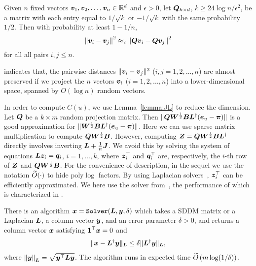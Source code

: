 \documentclass[10pt,twocolumn,twoside]{IEEEtran}
\begin{document}
\begin{lemma}
    \label{lemma:JL}
    Given $n$ fixed vectors \(\boldsymbol{v}_1,\boldsymbol{v}_2,\ldots,\boldsymbol{v}_n\in \mathbb{R}^d\) and
    \(\epsilon>0\), let
    \(\boldsymbol{Q}_{k\times d}\),  \(k\ge 24\log n/\epsilon^2\), be a matrix with each  entry equal  to \(1/\sqrt{k}\) or \(- 1/\sqrt{k}\)  with the same probability \(1/2\). Then with probability at least \(1-1/n\),
    \begin{equation*}
        \left\Vert\boldsymbol{v}_i-\boldsymbol{v}_j\right\Vert^2\approx_\epsilon\left\Vert\boldsymbol{Q}\boldsymbol{v}_i-\boldsymbol{Q}\boldsymbol{v}_j\right\Vert^2
    \end{equation*}
    for all all pairs  \(i,j\le n\).
\end{lemma}

 indicates that,  the pairwise distances \(\|\boldsymbol{v}_i-\boldsymbol{v}_j\|^2\) (\(i,j=1,2,\ldots, n\)) are almost preserved if we project the \(n\) vectors \(\boldsymbol{v}_i\) (\(i=1,2,\ldots, n\))  into a lower-dimensional space, spanned
by \(O(\log n)\) random vectors.

In order to compute  \(C(u)\), we use Lemma~\ref{lemma:JL} to reduce the dimension. Let \(\boldsymbol{Q}\) be a \(k\times m\) random projection matrix. Then  \(\|\boldsymbol{Q} \boldsymbol{W}^{\frac{1}{2}} \boldsymbol{B} \boldsymbol{L}^{\dagger}(\boldsymbol{e}_u-\boldsymbol{\pi})\|\) is a good approximation for \(\|\boldsymbol{W}^{\frac{1}{2}} \boldsymbol{B} \boldsymbol{L}^{\dagger} (\boldsymbol{e}_u - \boldsymbol{\pi})\|\). Here we can use sparse matrix multiplication to compute \(\boldsymbol{Q} \boldsymbol{W}^{\frac{1}{2}} \boldsymbol{B}\). However, computing \(\boldsymbol{Z}=\boldsymbol{Q} \boldsymbol{W}^{\frac{1}{2}} \boldsymbol{B} \boldsymbol{L}^{\dagger}\) directly involves inverting \(\boldsymbol{L}+\frac{1}{n}\boldsymbol{J}\). We avoid this by solving the system of equations \(\boldsymbol{L} \boldsymbol{z}_i=\boldsymbol{q}_i\), \(i=1,\ldots,k\), where  \(\boldsymbol{z}^\top_i\) and \(\boldsymbol{q}^\top_i\) are, respectively, the \(i\)-th row of \(\boldsymbol{Z}\) and \(\boldsymbol{Q} \boldsymbol{W}^{\frac{1}{2}} \boldsymbol{B}\). For the convenience  of description, in the sequel we use the notation \(\widetilde{O}(\cdot)\) to hide \(\mathrm{poly} \log \) factors. By using Laplacian solvers~\cite{SpTe04,Sp10,KoMiPe11,LiBr12,CoKyMiPaPeRaSu14,KySa16}, \(\boldsymbol{z}^\top _i\) can be efficiently approximated.  We here use the  solver from~\cite{CoKyMiPaPeRaSu14}, the performance of which is characterized in .

\begin{lemma}
    \label{lemma:ST}
    There is an algorithm \(\boldsymbol{x} = \mathtt{Solver}(\boldsymbol{L},\boldsymbol{y},\delta)\) which
    takes a SDDM matrix or a Laplacian \(\boldsymbol{L}\),
    a column vector \(\boldsymbol{y}\), and an error
    parameter \(\delta > 0\), and returns a column vector \(\boldsymbol{x}\) satisfying  \(\boldsymbol{1}^\top\boldsymbol{x} = 0\) and
    \[
        \|\boldsymbol{x} - \boldsymbol{L}^{\dagger} \boldsymbol{y}\|_{\boldsymbol{L}} \leq \delta \|\boldsymbol{L}^{\dagger} \boldsymbol{y}\|_{\boldsymbol{L}},
    \]
    where \(\left\Vert\boldsymbol{y}\right\Vert_{\boldsymbol{L}} = \sqrt{\boldsymbol{y}^{\top} \boldsymbol{L} \boldsymbol{y}}\).
    The algorithm runs in expected time \(\widetilde{O} \left(m \log(1/\delta) \right)\).
\end{lemma}
\end{document}
